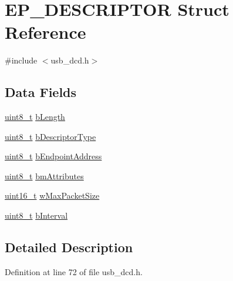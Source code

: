 \hypertarget{struct_e_p___d_e_s_c_r_i_p_t_o_r}{\section{E\-P\-\_\-\-D\-E\-S\-C\-R\-I\-P\-T\-O\-R Struct Reference}
\label{struct_e_p___d_e_s_c_r_i_p_t_o_r}
}


{\ttfamily \#include $<$usb\-\_\-dcd.\-h$>$}

\subsection*{Data Fields}
\begin{DoxyCompactItemize}
\item 
\hyperlink{stdint_8h_aba7bc1797add20fe3efdf37ced1182c5}{uint8\-\_\-t} \hyperlink{struct_e_p___d_e_s_c_r_i_p_t_o_r_a3e0aed7d11a9507e627ff5a4cfcc3b77}{b\-Length}
\item 
\hyperlink{stdint_8h_aba7bc1797add20fe3efdf37ced1182c5}{uint8\-\_\-t} \hyperlink{struct_e_p___d_e_s_c_r_i_p_t_o_r_a68ea7394194a49e3c6773f8072bca176}{b\-Descriptor\-Type}
\item 
\hyperlink{stdint_8h_aba7bc1797add20fe3efdf37ced1182c5}{uint8\-\_\-t} \hyperlink{struct_e_p___d_e_s_c_r_i_p_t_o_r_a5451ed00dc09adf71fba218843c0aa78}{b\-Endpoint\-Address}
\item 
\hyperlink{stdint_8h_aba7bc1797add20fe3efdf37ced1182c5}{uint8\-\_\-t} \hyperlink{struct_e_p___d_e_s_c_r_i_p_t_o_r_a04a3ac3a30a940a6e37621a94c6d6058}{bm\-Attributes}
\item 
\hyperlink{stdint_8h_a273cf69d639a59973b6019625df33e30}{uint16\-\_\-t} \hyperlink{struct_e_p___d_e_s_c_r_i_p_t_o_r_a8f9c7afe59182c066937c317538403be}{w\-Max\-Packet\-Size}
\item 
\hyperlink{stdint_8h_aba7bc1797add20fe3efdf37ced1182c5}{uint8\-\_\-t} \hyperlink{struct_e_p___d_e_s_c_r_i_p_t_o_r_af1e721dbaa61da85a71f914289dd4445}{b\-Interval}
\end{DoxyCompactItemize}


\subsection{Detailed Description}


Definition at line 72 of file usb\-\_\-dcd.\-h.



